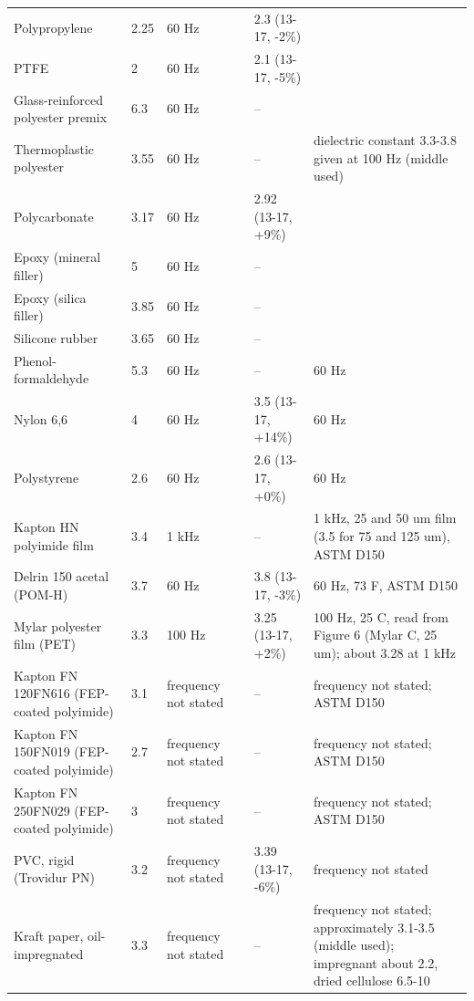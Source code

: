 \documentclass[10pt]{article}
\begin{document}
{\begin{longtable}[l]{@{}L{1.6in}lL{0.7in}L{0.4in}L{1.25in}L{1.45in}@{}}
Polypropylene & 2.25 & 60 Hz & \cite{dorf} & 2.3 (13-17, -2\%) &  \\
PTFE & 2 & 60 Hz & \cite{dorf} & 2.1 (13-17, -5\%) &  \\
Glass-reinforced polyester premix & 6.3 & 60 Hz & \cite{dorf} & -- &  \\
Thermoplastic polyester & 3.55 & 60 Hz & \cite{dorf} & -- & dielectric constant 3.3-3.8 given at 100 Hz (middle used) \\
Polycarbonate & 3.17 & 60 Hz & \cite{dorf} & 2.92 (13-17, +9\%) &  \\
Epoxy (mineral filler) & 5 & 60 Hz & \cite{dorf} & -- &  \\
Epoxy (silica filler) & 3.85 & 60 Hz & \cite{dorf} & -- &  \\
Silicone rubber & 3.65 & 60 Hz & \cite{dorf} & -- &  \\
Phenol-formaldehyde & 5.3 & 60 Hz & \cite{callister} & -- & 60 Hz \\
Nylon 6,6 & 4 & 60 Hz & \cite{callister} & 3.5 (13-17, +14\%) & 60 Hz \\
Polystyrene & 2.6 & 60 Hz & \cite{callister} & 2.6 (13-17, +0\%) & 60 Hz \\
Kapton HN polyimide film & 3.4 & 1 kHz & \cite{kapton} & -- & 1 kHz, 25 and 50 um film (3.5 for 75 and 125 um), ASTM D150 \\
Delrin 150 acetal (POM-H) & 3.7 & 60 Hz & \cite{delrin} & 3.8 (13-17, -3\%) & 60 Hz, 73 F, ASTM D150 \\
Mylar polyester film (PET) & 3.3 & 100 Hz & \cite{mylar} & 3.25 (13-17, +2\%) & 100 Hz, 25 C, read from Figure 6 (Mylar C, 25 um); about 3.28 at 1 kHz \\
Kapton FN 120FN616 (FEP-coated polyimide) & 3.1 & frequency not stated & \cite{kaptonfn} & -- & frequency not stated; ASTM D150 \\
Kapton FN 150FN019 (FEP-coated polyimide) & 2.7 & frequency not stated & \cite{kaptonfn} & -- & frequency not stated; ASTM D150 \\
Kapton FN 250FN029 (FEP-coated polyimide) & 3 & frequency not stated & \cite{kaptonfn} & -- & frequency not stated; ASTM D150 \\
PVC, rigid (Trovidur PN) & 3.2 & frequency not stated & \cite{trovidur} & 3.39 (13-17, -6\%) & frequency not stated \\
Kraft paper, oil-impregnated & 3.3 & frequency not stated & \cite{dorf} & -- & frequency not stated; approximately 3.1-3.5 (middle used); impregnant about 2.2, dried cellulose 6.5-10 \\

\end{longtable}}
\end{document}
